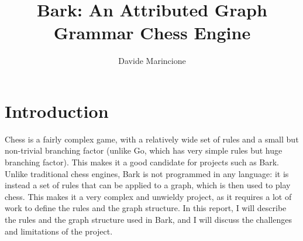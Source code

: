 \documentclass[twocolumn, a4paper]{scrartcl}
\title{Bark: An Attributed Graph Grammar Chess Engine}
\author{Davide Marincione}
\begin{document}
    \maketitle
    \section{Introduction}
    Chess is a fairly complex game, with a relatively wide set of rules and a small but non-trivial branching factor (unlike Go, which has very simple rules but huge branching factor). This makes it a good candidate for projects such as Bark. Unlike traditional chess engines, Bark is not programmed in any language: it is instead a set of rules that can be applied to a graph, which is then used to play chess. This makes it a very complex and unwieldy project, as it requires a lot of work to define the rules and the graph structure. In this report, I will describe the rules and the graph structure used in Bark, and I will discuss the challenges and limitations of the project.
\end{document}

